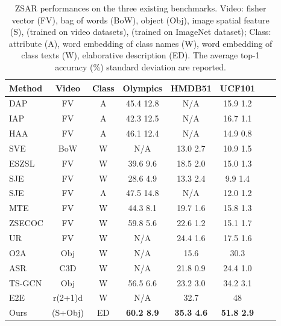 \begin{table}
	\centering
	\footnotesize
	\tabcolsep=0.1cm
	\begin{tabular}{lccccccc} \toprule
		Method & Video & Class & Olympics & HMDB51 & UCF101 \\ \midrule
		DAP \cite{lampert2009learning}   & FV & A & 45.4  12.8 & N/A & 15.9  1.2 \\
		IAP  \cite{lampert2009learning}  & FV & A & 42.3  12.5 & N/A & 16.7  1.1 \\
		HAA \cite{liu2011recognizing}  & FV & A & 46.1  12.4 & N/A & 14.9  0.8 \\
		SVE \cite{xu2015semantic}  & BoW & W & N/A & 13.0  2.7 & 10.9  1.5 \\
		ESZSL  \cite{romera2015embarrassingly} & FV & W & 39.6  9.6 & 18.5  2.0 & 15.0  1.3 \\
		SJE \cite{akata2015evaluation}  & FV & W & 28.6  4.9 & 13.3  2.4 & 9.9  1.4 \\
		SJE  \cite{akata2015evaluation} & FV & A & 47.5  14.8 & N/A & 12.0  1.2 \\
		MTE  \cite{xu2016multi} & FV & W & 44.3  8.1 & 19.7  1.6 & 15.8  1.3 \\
		ZSECOC \cite{qin2017zero} & FV & W & 59.8  5.6 & 22.6  1.2 & 15.1  1.7 \\
		UR \cite{zhu2018towards} & FV & W & N/A & 24.4  1.6 & 17.5  1.6 \\
		O2A \cite{jain2015objects2action}  & Obj & W & N/A & 15.6 & 30.3 \\
		ASR \cite{wang2017alternative} & C3D & W & N/A & 21.8  0.9 & 24.4  1.0 \\
		TS-GCN \cite{gao2019know} & Obj & W & 56.5  6.6 & 23.2  3.0 & 34.2  3.1 \\
		E2E \cite{brattoli2020rethinking} & r(2+1)d & W & N/A & 32.7 & 48 \\ \midrule
		Ours  & (S+Obj) & ED & \textbf{60.2  8.9} & \textbf{35.3  4.6} & \textbf{51.8  2.9}  \\
	\bottomrule
	\end{tabular}
	\caption{ZSAR performances on the three existing benchmarks. Video: fisher vector (FV), bag of words (BoW), object (Obj), image spatial feature (S), (trained on video datasets), (trained on ImageNet dataset); Class: attribute (A), word embedding of class names (W), word embedding of class texts (W), elaborative description (ED). The average top-1 accuracy (\%)  standard deviation are reported.}
	\label{tab:three_datasets_results}
\end{table} 
